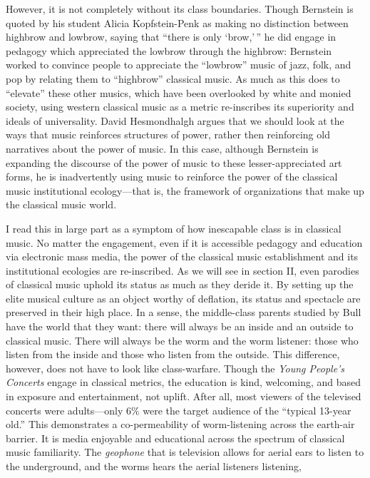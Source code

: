 \documentclass[12pt,letterpaper]{article}
\begin{document}
	However, it is not completely without its class boundaries.
	Though Bernstein is quoted by
	his student Alicia Kopfstein-Penk as making no distinction between
	highbrow and lowbrow, saying that ``there is only 
	`brow,'\,''\autocite[xvi]{Kopfstein}  he did engage in pedagogy which
	appreciated the lowbrow through the highbrow: Bernstein worked to
	convince people to appreciate the ``lowbrow'' music of jazz, folk, and
	pop by relating them to ``highbrow'' classical 
	music.\autocite[63]{Kopfstein} As much as this does to ``elevate''
	these other musics, which have been overlooked by white and monied 
	society, using western classical music as a metric re-inscribes its
	superiority and ideals of universality.  
	David Hesmondhalgh argues that we should look at the ways that
	music reinforces structures of power, rather then reinforcing old 
	narratives about the power of music.\autocite[xiii]{Kopfstein} 
	In this case, although Bernstein is expanding the discourse of the power
	of music to these lesser-appreciated art forms, he is inadvertently 
	using
	music to reinforce the power of the classical music institutional 
	ecology---that is, the framework of organizations that make up the 
	classical music world.\autocite[27]{Bull}  

	I read this in large part as a symptom of how inescapable class is in 
	classical music. No matter the engagement, even if it is accessible 
	pedagogy and education via electronic mass media, the power of the 
	classical music
	establishment and its institutional ecologies are re-inscribed. As
	we will see in section II, even parodies of classical music 
	uphold its status as much as they deride it. By 
	setting up the elite musical culture as an object worthy of deflation,
	its status and spectacle are preserved in their high 
	place.\autocite[252]{Garrett} In a sense, the middle-class parents 
	studied by Bull have the world that they want: there will always be
	an inside and an outside to classical music. There will always be the
	worm and the worm listener: those who listen from the inside and those
	who listen from
	the outside. This difference, however, does not have to look like
	class-warfare. Though the \textit{Young People's Concerts} engage in 
	classical metrics, the education is kind, welcoming, and 
	based in exposure and entertainment, not uplift. After all, most viewers
	of the televised concerts were adults---only 6\% were the
	target audience of the ``typical 13-year old.''\autocite[2]{Kopfstein}    
	This demonstrates a co-permeability of worm-listening across the
	earth-air barrier. It is media enjoyable and educational across the
	spectrum of classical music familiarity. The \textit{geophone} that is
	television allows for aerial ears to listen to the underground, and the
	worms hears the aerial listeners listening,    
\end{document}
